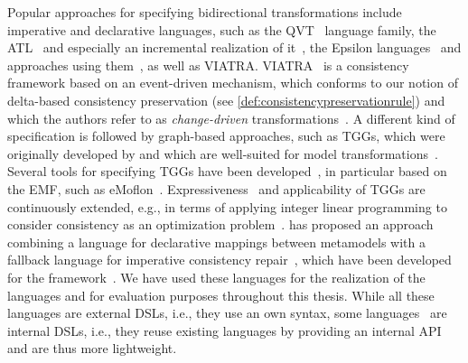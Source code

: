 Popular approaches for specifying bidirectional transformations include imperative and declarative languages, such as the \gls{QVT}~\cite{qvt} language family, the \gls{ATL}~\cite{jouault2006a,xiong2007backwardTransformation-ASE} and especially an incremental realization of it~\cite{martinez2017incrementalATL-SCP}, the Epsilon languages~\cite{kolovos2014epsilon-Book} and approaches using them~\cite{samimi-dehkordi2018evlStrace-IST}, as well as \gls{VIATRA}.
\gls{VIATRA}~\cite{bergmann2015viatra-ICMT, varro2016viatra-SoSym} is a consistency framework based on an event-driven mechanism, which conforms to our notion of delta-based consistency preservation (see \autoref{def:consistencypreservationrule}) and which the authors refer to as \emph{change-driven} transformations~\cite{bergmann2012changeDriven-SoSym}.
A different kind of specification is followed by graph-based approaches, such as \glspl{TGG}, which were originally developed by \textcite{schuerr1995a} and which are well-suited for model transformations~\cite{anjorin2014EfficientSynchronizationTGG-ECMFA}.
Several tools for specifying \glspl{TGG} have been developed~\cite{leblebici2014IncrementalTGGSurvey-GTVMT}, in particular based on the \gls{EMF}, such as eMoflon~\cite{anjorin2014diss}.
Expressiveness~\cite{anjorin2012complexManipulationTGG-BX} and applicability of \glspl{TGG} are continuously extended, e.g., in terms of applying integer linear programming to consider consistency as an optimization problem~\cite{weidmann2019TGGandILP-SLE,weidmann2020TGGsAndILPSchemaCompliance-FASE}.
 has proposed an approach combining a language for declarative mappings between metamodels with a fallback language for imperative consistency repair~, which have been developed for the \vitruv framework~.
We have used these languages for the realization of the \commonalities languages and for evaluation purposes throughout this thesis.
While all these languages are external \glspl{DSL}, i.e., they use an own syntax, some languages~\cite{buchmann2018bxtend-Modelsward, hinkel2019internalTransformation-SoSym} are internal \glspl{DSL}, i.e., they reuse existing languages by providing an internal \gls{API} and are thus more lightweight.

